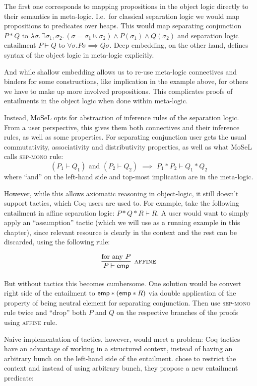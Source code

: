 The first one corresponds to mapping propositions in the object logic directly to their semantics in meta-logic.
I.e.\ for classical separation logic we would map propositions to predicates over heaps.
This would map separating conjunction \(P * Q\) to \(\lambda \sigma.\,\exists\sigma_1, \sigma_2.\, \left(\sigma = \sigma_1 \uplus \sigma_2\right) \wedge P (\sigma_1) \wedge Q(\sigma_2)\) and separation logic entailment \(P \vdash Q\) to \(\forall \sigma. P \sigma \implies Q \sigma\).
Deep embedding, on the other hand, defines syntax of the object logic in meta-logic explicitly.

And while shallow embedding allows us to re-use meta-logic connectives and binders for some constructions, like implication in the example above, for others we have to make up more involved propositions.
This complicates proofs of entailments in the object logic when done within meta-logic.

Instead, MoSeL opts for abstraction of inference rules of the separation logic.
From a user perspective, this gives them both connectives and their inference rules, as well as some properties.
For separating conjunction user gets the usual commutativity, associativity and distributivity properties, as well as what MoSeL calls \textsc{sep-mono} rule:
\[(P_1 \vdash Q_1) \text{ and } (P_2 \vdash Q_2) \,\, \implies \,\, P_1 * P_2 \vdash Q_1 * Q_2\]
where ``and'' on the left-hand side and top-most implication are in the meta-logic.

However, while this allows axiomatic reasoning in object-logic, it still doesn't support tactics, which Coq users are used to.
For example, take the following entailment in affine separation logic:
\(P * Q * R \vdash R\).
A user would want to simply apply an ``assumption'' tactic (which we will use as a running example in this chapter), since relevant resource is clearly in the context and the rest can be discarded, using the following rule:

\[ \infer[\textsc{affine}]{P \vdash \emp}{\text{for any } P } \]

But without tactics this becomes cumbersome.
One solution would be convert right side of the entailment to \(\textsf{emp} * (\textsf{emp} * R)\) via double application of the property of \emp being neutral element for separating conjunction.
Then use \textsc{sep-mono} rule twice and ``drop'' both \(P\) and \(Q\) on the respective branches of the proofs using \textsc{affine} rule.

Naive implementation of tactics, however, would meet a problem: Coq tactics have an advantage of working in a structured context, instead of having an arbitrary bunch on the left-hand side of the entailment.
\citet{krebbersInteractiveProofsHigherorder2017} chose to restrict the context and instead of using arbitrary bunch, they propose a new entailment predicate:


